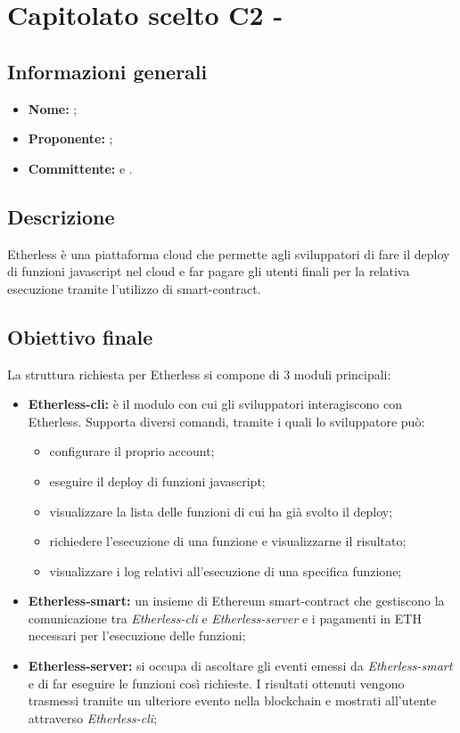 \section{Capitolato scelto C2 - \NomeProgetto}

\subsection{Informazioni generali}
	\begin{itemize}
		\item \textbf{Nome:} \NomeProgetto{}; 
		\item \textbf{Proponente:} \Proponente;
		\item \textbf{Committente:} \TV{} e \RC{}. 
	\end{itemize}

\subsection{Descrizione}
Etherless è una piattaforma cloud che permette agli sviluppatori di fare il deploy di funzioni javascript nel cloud e far pagare gli utenti finali per la relativa esecuzione tramite l'utilizzo di smart-contract. 

\subsection{Obiettivo finale}
La struttura richiesta per Etherless si compone di 3 moduli principali: 
\begin{itemize}
	\item \textbf{Etherless-cli:} è il modulo con cui gli sviluppatori interagiscono con Etherless. Supporta diversi comandi, tramite i quali lo sviluppatore può: 
		\begin{itemize}
			\item configurare il proprio account; 
			\item eseguire il deploy di funzioni javascript; 
			\item visualizzare la lista delle funzioni di cui ha già svolto il deploy; 
			\item richiedere l'esecuzione di una funzione e visualizzarne il risultato; 
			\item visualizzare i log relativi all'esecuzione di una specifica funzione; 
		\end{itemize}  
	\item \textbf{Etherless-smart:} un insieme di Ethereum smart-contract che gestiscono la comunicazione tra \textit{Etherless-cli} e \textit{Etherless-server} e i pagamenti in ETH necessari per l'esecuzione delle funzioni; 
	\item \textbf{Etherless-server:} si occupa di ascoltare gli eventi emessi da \textit{Etherless-smart} e di far eseguire le funzioni così richieste. I risultati ottenuti vengono trasmessi tramite un ulteriore evento nella blockchain e mostrati all'utente attraverso \textit{Etherless-cli};  
\end{itemize}

